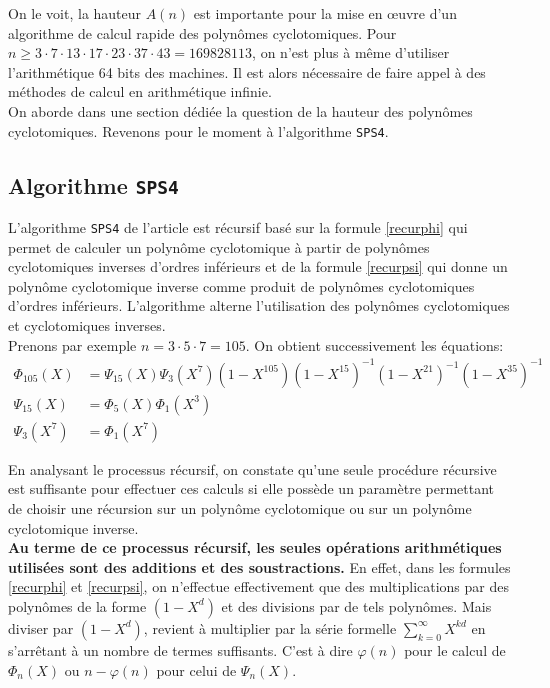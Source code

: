 \documentclass{article}
\newcounter{question}
\theoremstyle{break}                  %
\begin{document}
On le voit, la hauteur $A(n)$ est importante pour la mise en œuvre d'un algorithme de calcul rapide des polynômes cyclotomiques. Pour $n \ge 3 \cdot 7 \cdot 13 \cdot 17 \cdot 23 \cdot 37 \cdot 43 = 169828113$, on n'est plus à même d'utiliser l'arithmétique 64 bits des machines. Il est alors nécessaire de faire appel à des méthodes de calcul en arithmétique infinie.\\

On aborde dans une section dédiée la question de la hauteur des polynômes cyclotomiques. Revenons pour le moment à l'algorithme \texttt{SPS4}.

\subsection*{Algorithme \texttt{SPS4}}
L'algorithme \texttt{SPS4} de l'article est récursif basé sur la formule \ref{recurphi} qui permet de calculer un polynôme cyclotomique à partir de polynômes cyclotomiques inverses d'ordres inférieurs et de la formule \ref{recurpsi} qui donne un polynôme cyclotomique inverse comme produit de polynômes cyclotomiques d'ordres inférieurs. L'algorithme alterne l'utilisation des polynômes cyclotomiques et cyclotomiques inverses.\\

Prenons par exemple $n = 3 \cdot 5 \cdot 7 = 105$. On obtient successivement les équations:
\begin{align*}
	\Phi_{105}(X) &= \Psi_{15}(X)\Psi_{3}(X^7)(1-X^{105})(1-X^{15})^{-1}(1-X^{21})^{-1}(1-X^{35})^{-1}\\
	\Psi_{15}(X) &= \Phi_{5}(X) \Phi_{1}(X^3)\\
	\Psi_{3}(X^7) &= \Phi_{1}(X^7) 
\end{align*}

En analysant le processus récursif, on constate qu'une seule procédure récursive est suffisante pour effectuer ces calculs si elle possède un paramètre permettant de choisir une récursion sur un polynôme cyclotomique ou sur un polynôme cyclotomique inverse.\\

\textbf{Au terme de ce processus récursif, les seules opérations arithmétiques utilisées sont des additions et des soustractions.} En effet, dans les formules \ref{recurphi} et \ref{recurpsi}, on n'effectue effectivement que des multiplications par des polynômes de la forme $(1-X^d)$ et des divisions par de tels polynômes. Mais diviser par $(1-X^d)$, revient à multiplier par la série formelle $\displaystyle \sum_{k = 0}^\infty X^{kd}$ en s'arrêtant à un nombre de termes suffisants. C'est à dire $\varphi(n)$ pour le calcul de $\Phi_n(X)$ ou $n - \varphi(n)$ pour celui de $\Psi_n(X)$.\\
\end{document}
